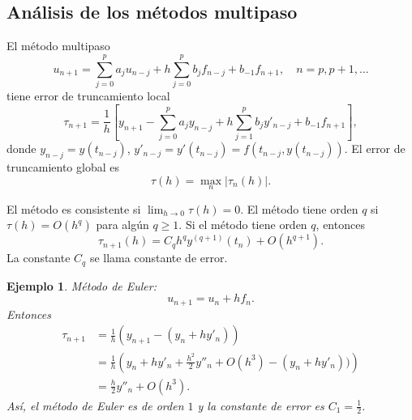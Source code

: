 \documentclass[11pt,letterpaper]{article}
\newtheorem{example}{Ejemplo}
\begin{document}
\subsection{Análisis de los métodos multipaso}
El método multipaso
\begin{equation}
  u_{n+1}
  =
  \sum_{j=0}^{p}a_ju_{n-j}
  +
  h
  \sum_{j=0}^{p}b_jf_{n-j} + b_{-1}f_{n+1},
  \quad
  n=p, p+1,\dots
\end{equation}
tiene error de truncamiento local
\begin{equation}
  \tau_{n+1}
  =
  \frac{1}{h}
  \left[
    y_{n+1}
    -
    \sum_{j=0}^{p} a_jy_{n-j}
    +
    h
    \sum_{j=1}^{p}b_{j}y'_{n-j}
    +
    b_{-1}f_{n+1}
  \right]
,\end{equation}
donde $y_{n-j}=y(t_{n-j})$,
$y'_{n-j}=y'(t_{n-j})=f(t_{n-j},y(t_{n-j}))$.
El error de truncamiento global es
\begin{equation}
  \tau(h) = \max_n |\tau_{n}(h)|
.\end{equation}

El método es consistente si $\lim_{h\to 0}\tau(h)=0$.
El método tiene orden $q$ si $\tau(h)=O(h^{q})$ para algún $q\geq 1$.
Si el método tiene orden $q$, entonces
\begin{equation}
  \tau_{n+1}(h) = C_qh^qy^{(q+1)}(t_n) + O(h^{q+1})
.\end{equation}
La constante $C_q$ se llama constante de error.

\begin{example}
  Método de Euler:
  \begin{equation}
    u_{n+1} = u_{n} + hf_n
  .\end{equation}
  Entonces
  \begin{align}
    \tau_{n+1}
    &= \frac{1}{h}(y_{n+1} - (y_n+hy'_n)) \\
    &= \frac{1}{h}
    \left(
    y_n + hy'_n + \frac{h^{2}}{2} y''_n + O(h^{3})
    - (y_n + hy'_n))
    \right)
    \\
    &= \frac{h}{2}y''_n + O(h^{3})
  .\end{align}
  Así, el método de Euler es de orden $1$ y la constante de error es
  $C_1=\frac{1}{2}$.
\end{example}
\end{document}
